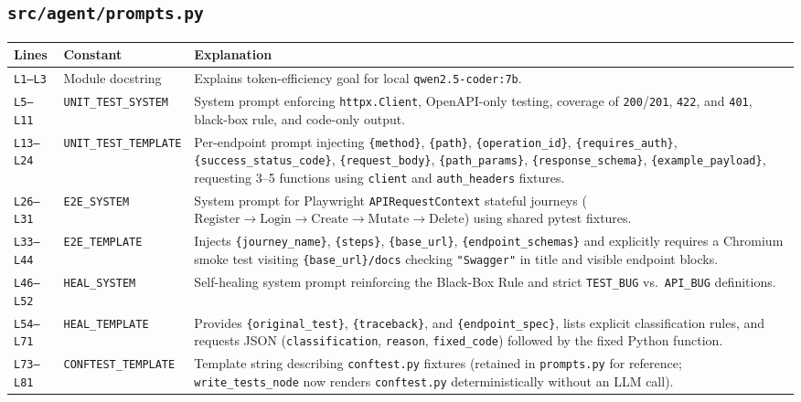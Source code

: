 \documentclass[11pt,a4paper]{article}
\begin{document}
\subsection{\texttt{src/agent/prompts.py}}
\begin{longtable}{L{1.4cm} L{5.2cm} L{9.0cm}}
\toprule
\textbf{Lines} & \textbf{Constant} & \textbf{Explanation} \\
\midrule
\endhead
\texttt{L1--L3} & Module docstring & Explains token-efficiency goal for local \texttt{qwen2.5-coder:7b}. \\
\texttt{L5--L11} & \texttt{UNIT\_TEST\_SYSTEM} & System prompt enforcing \texttt{httpx.Client}, OpenAPI-only testing, coverage of \texttt{200}/\texttt{201}, \texttt{422}, and \texttt{401}, black-box rule, and code-only output. \\
\texttt{L13--L24} & \texttt{UNIT\_TEST\_TEMPLATE} & Per-endpoint prompt injecting \texttt{\{method\}}, \texttt{\{path\}}, \texttt{\{operation\_id\}}, \texttt{\{requires\_auth\}}, \texttt{\{success\_status\_code\}}, \texttt{\{request\_body\}}, \texttt{\{path\_params\}}, \texttt{\{response\_schema\}}, \texttt{\{example\_payload\}}, requesting 3--5 functions using \texttt{client} and \texttt{auth\_headers} fixtures. \\
\texttt{L26--L31} & \texttt{E2E\_SYSTEM} & System prompt for Playwright \texttt{APIRequestContext} stateful journeys ($\text{Register} \rightarrow \text{Login} \rightarrow \text{Create} \rightarrow \text{Mutate} \rightarrow \text{Delete}$) using shared pytest fixtures. \\
\texttt{L33--L44} & \texttt{E2E\_TEMPLATE} & Injects \texttt{\{journey\_name\}}, \texttt{\{steps\}}, \texttt{\{base\_url\}}, \texttt{\{endpoint\_schemas\}} and explicitly requires a Chromium smoke test visiting \texttt{\{base\_url\}/docs} checking \texttt{"Swagger"} in title and visible endpoint blocks. \\
\texttt{L46--L52} & \texttt{HEAL\_SYSTEM} & Self-healing system prompt reinforcing the Black-Box Rule and strict \texttt{TEST\_BUG} vs.\ \texttt{API\_BUG} definitions. \\
\texttt{L54--L71} & \texttt{HEAL\_TEMPLATE} & Provides \texttt{\{original\_test\}}, \texttt{\{traceback\}}, and \texttt{\{endpoint\_spec\}}, lists explicit classification rules, and requests JSON (\texttt{classification}, \texttt{reason}, \texttt{fixed\_code}) followed by the fixed Python function. \\
\texttt{L73--L81} & \texttt{CONFTEST\_TEMPLATE} & Template string describing \texttt{conftest.py} fixtures (retained in \texttt{prompts.py} for reference; \texttt{write\_tests\_node} now renders \texttt{conftest.py} deterministically without an LLM call). \\
\bottomrule
\end{longtable}
\end{document}
